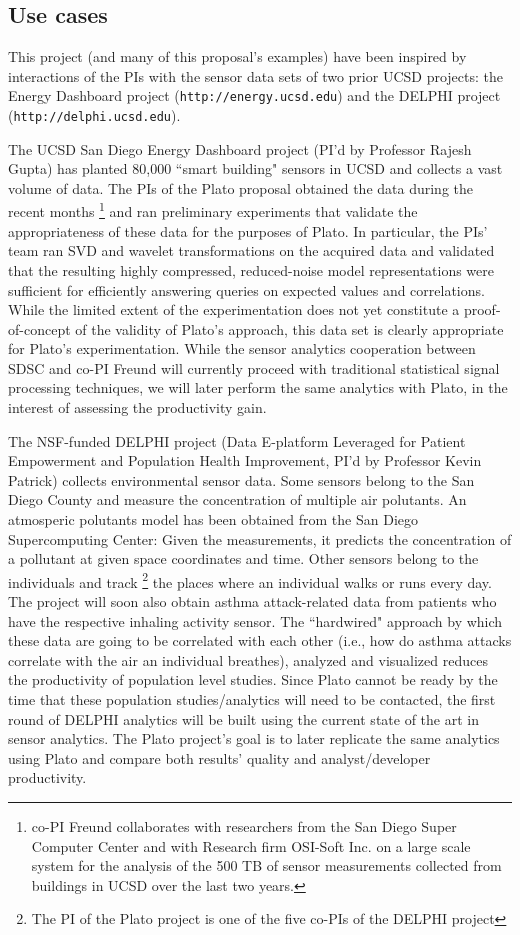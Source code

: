 \subsection{Use cases}
\label{sec:use-cases}
This project (and many of this proposal's examples) have been inspired by interactions of the PIs with the sensor data sets of two prior UCSD projects: the Energy Dashboard project ({\tt http://energy.ucsd.edu}) and the DELPHI project ({\tt http://delphi.ucsd.edu}). 

The UCSD San Diego Energy Dashboard project (PI'd by Professor Rajesh Gupta) has planted 80,000 ``smart building" sensors in UCSD and collects a vast volume of data. The PIs of the Plato proposal obtained the data during the recent months%
\footnote{co-PI Freund collaborates with researchers from the San Diego
Super Computer Center and with Research firm OSI-Soft Inc. on a large
scale system for the analysis of the 500 TB of sensor measurements collected from
buildings in UCSD over the last two years.
} 
and ran preliminary experiments that validate the appropriateness of these data for the purposes of Plato. In particular, the PIs' team ran SVD and wavelet transformations on the acquired data and validated that the resulting highly compressed, reduced-noise model representations were sufficient for efficiently answering queries on expected values and correlations. While the limited extent of the experimentation does not yet constitute a proof-of-concept of the validity of Plato's approach, this data set is clearly appropriate for Plato's experimentation. While the sensor analytics cooperation between SDSC and co-PI Freund will currently proceed with traditional statistical signal processing techniques, we will later perform the same analytics with Plato, in the interest of assessing the productivity gain. 

The NSF-funded DELPHI project (Data E-platform Leveraged for Patient Empowerment and Population Health Improvement, PI'd by Professor Kevin Patrick) collects environmental sensor data. Some sensors belong to the San Diego County and measure the concentration of multiple air polutants. An atmosperic polutants model has been obtained from the San Diego Supercomputing Center: Given the measurements, it predicts the concentration of a pollutant at given space coordinates and time. Other sensors belong to the individuals and track %
\footnote{The PI of the Plato project is one of the five co-PIs of the DELPHI project} 
the places where an individual walks or runs every day. The project will soon also obtain asthma attack-related data from patients who have the respective inhaling activity sensor. The ``hardwired" approach by which these data are going to be correlated with each other (i.e., how do asthma attacks correlate with the air an individual breathes), analyzed and visualized reduces the productivity of population level studies. Since Plato cannot be ready by the time that these population studies/analytics will need to be contacted, the first round of DELPHI analytics will be built using the current state of the art in sensor analytics. The Plato project's goal is to later replicate the same analytics using Plato and compare both results' quality and analyst/developer productivity.
